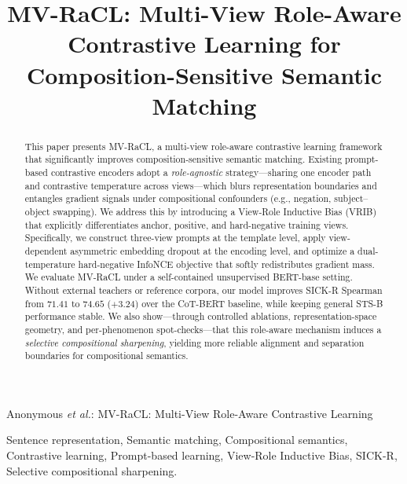 \documentclass[lettersize,journal]{IEEEtran}
\begin{document}
\title{MV-RaCL: Multi-View Role-Aware Contrastive Learning for Composition-Sensitive Semantic Matching}

\author{}

%
{Anonymous \MakeLowercase{\textit{et al.}}: MV-RaCL: Multi-View Role-Aware Contrastive Learning}


\maketitle

\begin{abstract}
This paper presents MV-RaCL, a multi-view role-aware contrastive learning framework that significantly improves composition-sensitive semantic matching. Existing prompt-based contrastive encoders adopt a \emph{role-agnostic} strategy---sharing one encoder path and contrastive temperature across views---which blurs representation boundaries and entangles gradient signals under compositional confounders (e.g., negation, subject--object swapping). We address this by introducing a View-Role Inductive Bias (VRIB) that explicitly differentiates anchor, positive, and hard-negative training views. Specifically, we construct three-view prompts at the template level, apply view-dependent asymmetric embedding dropout at the encoding level, and optimize a dual-temperature hard-negative InfoNCE objective that softly redistributes gradient mass. We evaluate MV-RaCL under a self-contained unsupervised BERT-base setting. Without external teachers or reference corpora, our model improves SICK-R Spearman from $71.41$ to $74.65$ ($+3.24$) over the CoT-BERT baseline, while keeping general STS-B performance stable. We also show---through controlled ablations, representation-space geometry, and per-phenomenon spot-checks---that this role-aware mechanism induces a \emph{selective compositional sharpening}, yielding more reliable alignment and separation boundaries for compositional semantics.
\end{abstract}

\begin{IEEEkeywords}
Sentence representation, Semantic matching, Compositional semantics, Contrastive learning, Prompt-based learning, View-Role Inductive Bias, SICK-R, Selective compositional sharpening.
\end{IEEEkeywords}
\end{document}
